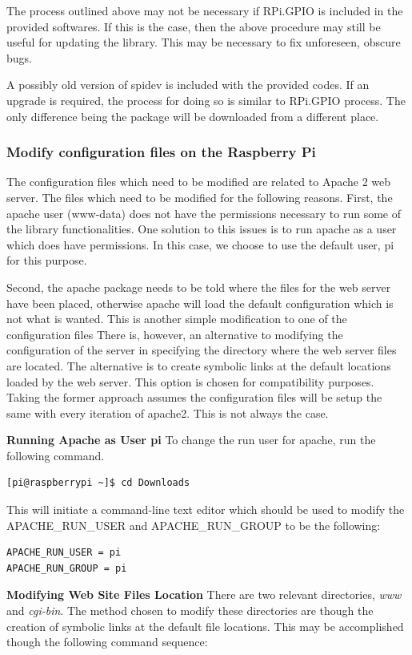 \documentclass{article}	%
\begin{document}
\begin{multicols}{2}
The process outlined above may not be necessary if
RPi.GPIO is included in the provided softwares.
If this is the case, then
the above procedure may still be useful for updating
the library.
This may be necessary to fix unforeseen, obscure bugs.

A possibly old version of spidev is included with the provided codes.
If an upgrade is required,
the process for doing so is similar to RPi.GPIO process.
The only difference being the package
will be downloaded from a different place.

\subsubsection{Modify configuration files on the Raspberry Pi}
The configuration files which need to be modified are
related to Apache 2 web server.
The files which need to be modified for the following reasons.
First, the apache user (www-data) does not have the permissions necessary
to run some of the library functionalities.
One solution to this issues is to run apache as 
a user which does have permissions.
In this case,
we choose to use the default user, pi for this purpose.

Second, the apache package needs to be told where
the files for the web server have been placed,
otherwise apache will load the default configuration
which is not what is wanted.
This is another simple modification to one of the configuration files
There is, however, an alternative to modifying the configuration of the server
in specifying the directory where the web server files are located.
The alternative is to create symbolic links at the default locations 
loaded by the web server.
This option is chosen for compatibility purposes.
Taking the former approach assumes the configuration files will
be setup the same with every iteration of apache2.
This is not always the case.

\textbf{Running Apache as User pi}
To change the run user for apache,
run the following command.
\begin{lstlisting}
[pi@raspberrypi ~]$ cd Downloads
\end{lstlisting}
This will initiate a command-line
text editor which should be used to 
modify the APACHE\_RUN\_USER and APACHE\_RUN\_GROUP
to be the following:
\begin{lstlisting}
APACHE_RUN_USER = pi
APACHE_RUN_GROUP = pi
\end{lstlisting}

\textbf{Modifying Web Site Files Location}
There are two relevant directories,
\textit{www} and \textit{cgi-bin}.
The method chosen to modify these
directories are though the creation of
symbolic links at the default file locations.
This may be accomplished though the following command sequence:


\end{multicols}
\end{document}
